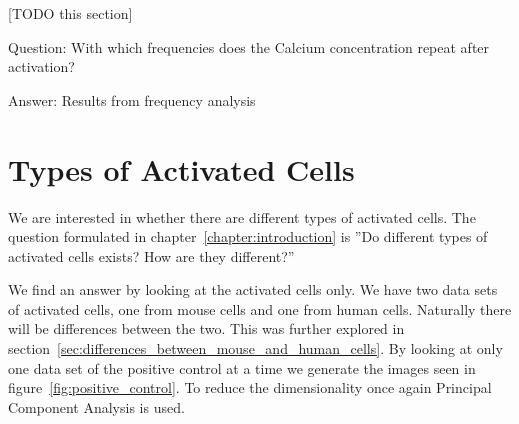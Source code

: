 [TODO this section]

Question: With which frequencies does the Calcium concentration repeat after activation?

Answer: Results from frequency analysis

\section{Types of Activated Cells}

We are interested in whether there are different types of activated cells. The question formulated in chapter~\ref{chapter:introduction} is ''Do different types of activated cells exists? How are they different?''

We find an answer by looking at the activated cells only. We have two data sets of activated cells, one from mouse cells and one from human cells. Naturally there will be differences between the two. This was further explored in section~\ref{sec:differences_between_mouse_and_human_cells}. By looking at only one data set of the positive control at a time we generate the images seen in figure~\ref{fig:positive_control}. To reduce the dimensionality once again Principal Component Analysis is used.

